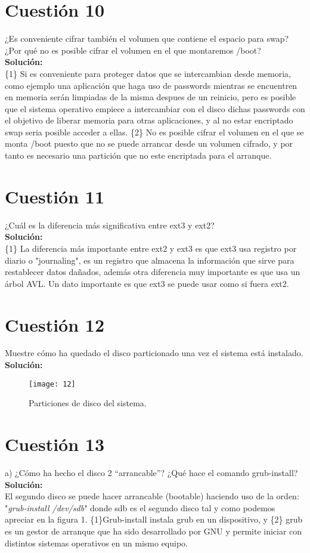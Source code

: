 \documentclass[a4paper, 11pt]{article} %
\begin{document}
\section{Cuestión 10}
¿Es conveniente cifrar también el volumen que contiene el espacio para swap? ¿Por qué no es posible cifrar el volumen en el que montaremos /boot?\\
\textbf{Solución:}\\
\{1\} Si es conveniente para proteger datos que se intercambian desde memoria, como ejemplo una aplicación que haga uso de passwords mientras se encuentren en memoria serán limpiadas de la misma despues de un reinicio, pero es posible que el sistema operativo empiece a intercambiar con el disco dichas passwords con el objetivo de liberar memoria para otras aplicaciones, y al no estar encriptado swap seria posible acceder a ellas.
\{2\} No es posible cifrar el volumen en el que se monta /boot puesto que no se puede arrancar desde un volumen cifrado, y por tanto es necesario una partición que no este encriptada para el arranque.

\section{Cuestión 11}
¿Cuál es la diferencia más significativa entre ext3 y ext2?\\
\textbf{Solución:}\\
\{1\} La diferencia más importante entre ext2 y ext3 es que ext3 usa registro por diario o "journaling", es un registro que almacena la información que sirve para restablecer datos dañados, además otra diferencia muy importante es que usa un árbol AVL. Un dato importante es que ext3 se puede usar como si fuera ext2.
\section{Cuestión 12}
Muestre cómo ha quedado el disco particionado una vez el sistema está instalado.\\
\textbf{Solución:}\\
\begin{figure}[h]
\centering 
\texttt{[image: 12]} 
\caption{Particiones de disco del sistema.} 
\label{contexto:figura} 
\end{figure}
\section{Cuestión 13}
a) ¿Cómo ha hecho el disco 2 “arrancable”? ¿Qué hace el comando grub-install?\\
\textbf{Solución:}\\
El segundo disco se puede hacer arrancable (bootable) haciendo uso de la orden: "\textit{grub-install /dev/sdb}" donde sdb es el segundo disco tal y como podemos apreciar en la figura 1. \{1\}Grub-install instala grub en un dispositivo, y \{2\} grub es un gestor de arranque que ha sido desarrollado por GNU y permite iniciar con distintos sistemas operativos en un mismo equipo.
\end{document}
